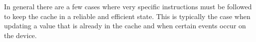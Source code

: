 \documentclass[pdftex,a4paper,12pt,twoside]{report}
\begin{document}
\\\\
In general there are a few cases where very specific instructions must be followed to keep the cache in a reliable and efficient state. This is typically the case when updating a value that is already in the cache and when certain events occur on the device.




\listoffigures
\listoftables
\end{document}
